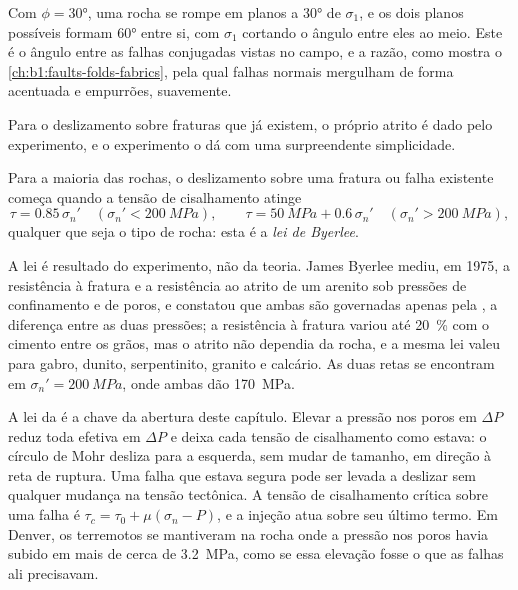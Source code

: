 Com $\phi = \ang{30}$, uma rocha se rompe em planos a \ang{30} de $\sigma_1$, e os dois planos possíveis formam \ang{60} entre si, com $\sigma_1$ cortando o ângulo entre eles ao meio. Este é o ângulo entre as falhas conjugadas vistas no campo, e a razão, como mostra o \cref{ch:b1:faults-folds-fabrics}, pela qual falhas normais mergulham de forma acentuada e empurrões, suavemente.

Para o deslizamento sobre fraturas que já existem, o próprio atrito é dado pelo experimento, e o experimento o dá com uma surpreendente simplicidade.

\begin{proposition}\label{prop:b1:stress-strain-rheology:byerlee}
Para a maioria das rochas, o deslizamento sobre uma fratura ou falha existente começa quando a tensão de cisalhamento atinge
\[
  \tau = 0.85\,\sigma_n' \quad (\sigma_n' < \qty{200}{MPa}), \qquad
  \tau = \qty{50}{MPa} + 0.6\,\sigma_n' \quad (\sigma_n' > \qty{200}{MPa}),
\]
qualquer que seja o tipo de rocha: esta é a \emph{lei de Byerlee}.
\end{proposition}
\admitted

A lei é resultado do experimento, não da teoria. James Byerlee mediu, em 1975, a resistência à fratura e a resistência ao atrito de um arenito sob pressões de confinamento e de poros, e constatou que ambas são governadas apenas pela , a diferença entre as duas pressões; a resistência à fratura variou até \qty{20}{\percent} com o cimento entre os grãos, mas o atrito não dependia da rocha, e a mesma lei valeu para gabro, dunito, serpentinito, granito e calcário. As duas retas se encontram em $\sigma_n' = \qty{200}{MPa}$, onde ambas dão \qty{170}{MPa}.

A lei da  é a chave da abertura deste capítulo. Elevar a pressão nos poros em $\Delta P$ reduz toda  efetiva em $\Delta P$ e deixa cada tensão de cisalhamento como estava: o círculo de Mohr desliza para a esquerda, sem mudar de tamanho, em direção à reta de ruptura. Uma falha que estava segura pode ser levada a deslizar sem qualquer mudança na tensão tectônica. A tensão de cisalhamento crítica sobre uma falha é $\tau_c = \tau_0 + \mu(\sigma_n - P)$, e a injeção atua sobre seu último termo. Em Denver, os terremotos se mantiveram na rocha onde a pressão nos poros havia subido em mais de cerca de \qty{3.2}{MPa}, como se essa elevação fosse o que as falhas ali precisavam.

